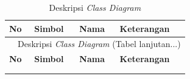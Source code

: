 \begin{enumerate}
	      {
	      \fontsize{10}{13}\selectfont
	      \begin{longtable}{p{0.5cm} p{2cm} p{2.5cm} p{7.4cm}}
		      \caption{Deskripsi \textit{Class Diagram}}
		      \label{tab23}                                                                                                                                                                                                                                                                                                                                                                   \\
		      \hline
		      \textbf{No} & \textbf{Simbol}                                                                                                  & \textbf{Nama}                                                                             & \textbf{Keterangan}                                                                                                                                \\
		      \hline
		      \endfirsthead
		      \multicolumn{4}{c}{\normalsize\tablename\ \textbf{\thetable}\ {{Deskripsi \textit{Class Diagram} \space (Tabel lanjutan...)}}}                                                                                                                                                                                                                                                             \\
		      \hline
		      \textbf{No} & \textbf{Simbol}                                                                                                  & \textbf{Nama}                                                                             & \textbf{Keterangan}                                                                                                                                \\
		      \hline                                                                                                                                                                                                                                                                                                                                                                          \\
		      \endhead
		      \hline
		      \endfoot


\end{longtable}}
\end{enumerate}
